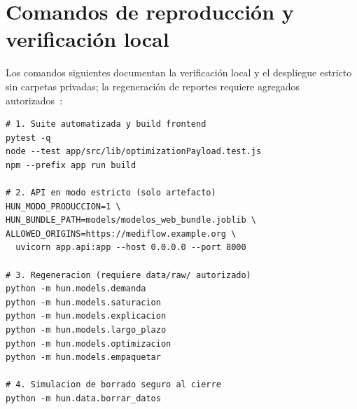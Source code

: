 \FloatBarrier

\raggedbottom
\section{Comandos de reproducción y verificación local}
\label{app:comandos}

Los comandos siguientes documentan la verificación local y el despliegue estricto sin carpetas privadas; la regeneración de reportes requiere agregados autorizados~\cite{mediflow2026informe,mediflow2026auditoria}:
{\scriptsize
\begin{verbatim}
# 1. Suite automatizada y build frontend
pytest -q
node --test app/src/lib/optimizationPayload.test.js
npm --prefix app run build

# 2. API en modo estricto (solo artefacto)
HUN_MODO_PRODUCCION=1 \
HUN_BUNDLE_PATH=models/modelos_web_bundle.joblib \
ALLOWED_ORIGINS=https://mediflow.example.org \
  uvicorn app.api:app --host 0.0.0.0 --port 8000

# 3. Regeneracion (requiere data/raw/ autorizado)
python -m hun.models.demanda
python -m hun.models.saturacion
python -m hun.models.explicacion
python -m hun.models.largo_plazo
python -m hun.models.optimizacion
python -m hun.models.empaquetar

# 4. Simulacion de borrado seguro al cierre
python -m hun.data.borrar_datos
\end{verbatim}
}
